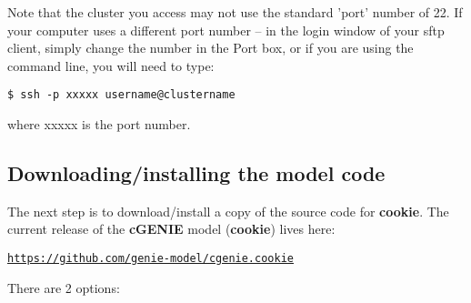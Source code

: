 \vspace{1mm}
Note that the cluster you access may not use the standard 'port' number of \textsf{\footnotesize 22}. If your computer uses a different port number -- in the login window of your sftp client, simply change the number in the \textsf{\footnotesize Port} box, or if you are using the command line, you will need to type:
\vspace{-1mm}
\begin{verbatim}
$ ssh -p xxxxx username@clustername
\end{verbatim}
\vspace{-1mm}
where \textsf{\footnotesize xxxxx} is the port number.


\subsection{Downloading/installing the model code}

The next step is to download/install a copy of the source code for \textbf{cookie}. The current release of the \textbf{cGENIE} model (\textbf{cookie}) lives here:

\vspace{1mm}
\href{https://github.com/genie-model/cgenie.cookie}{\texttt{https://github.com/genie-model/cgenie.cookie}}
\vspace{2mm}

There are 2 options:

